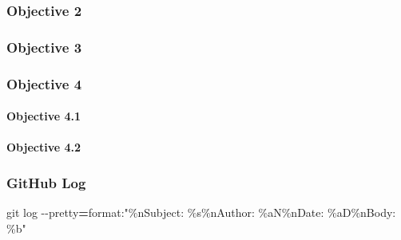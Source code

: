 \documentclass[
]{article}
\newenvironment{Shaded}{\begin{snugshade}}{\end{snugshade}}
\newcommand{\AttributeTok}[1]{\textcolor[rgb]{0.77,0.63,0.00}{#1}}
\newcommand{\FunctionTok}[1]{\textcolor[rgb]{0.00,0.00,0.00}{#1}}
\newcommand{\NormalTok}[1]{#1}
\newcommand{\OperatorTok}[1]{\textcolor[rgb]{0.81,0.36,0.00}{\textbf{#1}}}
\newcommand{\StringTok}[1]{\textcolor[rgb]{0.31,0.60,0.02}{#1}}
\begin{document}
\hypertarget{objective-2}{%
\subsubsection{Objective 2}\label{objective-2}}

\hypertarget{objective-3}{%
\subsubsection{Objective 3}\label{objective-3}}

\hypertarget{objective-4}{%
\subsubsection{Objective 4}\label{objective-4}}

\hypertarget{objective-4.1}{%
\paragraph{Objective 4.1}\label{objective-4.1}}

\hypertarget{objective-4.2}{%
\paragraph{Objective 4.2}\label{objective-4.2}}

\hypertarget{github-log}{%
\subsubsection{GitHub Log}\label{github-log}}

\begin{Shaded}
\begin{Highlighting}[]
\FunctionTok{git}\NormalTok{ log }\AttributeTok{{-}{-}pretty}\OperatorTok{=}\NormalTok{format:}\StringTok{"\%nSubject: \%s\%nAuthor: \%aN\%nDate: \%aD\%nBody: \%b"}
\end{Highlighting}
\end{Shaded}
\end{document}
